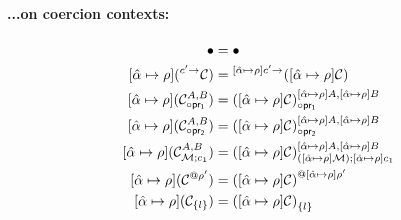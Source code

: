 \documentclass{article}
\newcommand{\mypar}[1]{\vspace{0.2cm}\paragraph{#1:} \hfill\vspace{0.1cm}}
\begin{document}
\begin{minipage}[t]{0.49\textwidth}
  \mypar{...on coercion contexts}
\begin{align*}
  [\unification{\alpha}{\rho}]\bullet                       &= \bullet\\
  [\unification{\alpha}{\rho}](\arrCC{\mathcal{C}}{c'})     &= \arrCC{([\unification{\alpha}{\rho}]\mathcal{C})}{[\unification{\alpha}{\rho}]c'}\\
  [\unification{\alpha}{\rho}](\projlCC{\mathcal{C}}{A}{B}) &= \projlCC{([\unification{\alpha}{\rho}]\mathcal{C})}{[\unification{\alpha}{\rho}]A}{[\unification{\alpha}{\rho}]B}\\
  [\unification{\alpha}{\rho}](\projrCC{\mathcal{C}}{A}{B}) &= \projrCC{([\unification{\alpha}{\rho}]\mathcal{C})}{[\unification{\alpha}{\rho}]A}{[\unification{\alpha}{\rho}]B}\\
  [\unification{\alpha}{\rho}](\mpCC{\mathcal{C}}{\mathcal{M}}{c_1}{A}{B}) &= \mpCC{([\unification{\alpha}{\rho}]\mathcal{C})}{([\unification{\alpha}{\rho}]\mathcal{M})}{[\unification{\alpha}{\rho}]c_1}{[\unification{\alpha}{\rho}]A}{[\unification{\alpha}{\rho}]B}\\
  [\unification{\alpha}{\rho}](\alllCC{\mathcal{C}}{\rho'}) &= \alllCC{([\unification{\alpha}{\rho}]\mathcal{C})}{[\unification{\alpha}{\rho}]\rho'}\\
  [\unification{\alpha}{\rho}](\recCC{\mathcal{C}}{l})     &= \recCC{([\unification{\alpha}{\rho}]\mathcal{C})}{l}
\end{align*}
\end{minipage}
\end{document}
